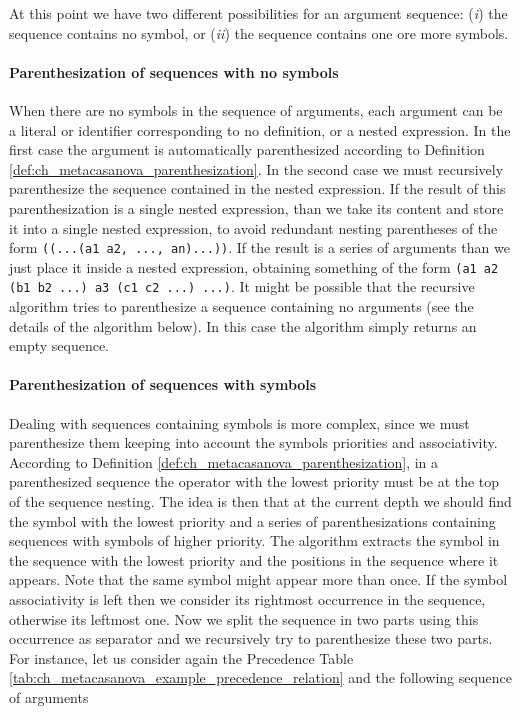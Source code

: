 At this point we have two different possibilities for an argument sequence: (\textit{i}) the sequence contains no symbol, or (\textit{ii}) the sequence contains one ore more symbols.

\paragraph{Parenthesization of sequences with no symbols}
When there are no symbols in the sequence of arguments, each argument can be a literal or identifier corresponding to no definition, or a nested expression. In the first case the argument is automatically parenthesized according to Definition \ref{def:ch_metacasanova_parenthesization}. In the second case we must recursively parenthesize the sequence contained in the nested expression. If the result of this parenthesization is a single nested expression, than we take its content and store it into a single nested expression, to avoid redundant nesting parentheses of the form \texttt{((...(a1 a2, ..., an)...))}. If the result is a series of arguments than we just place it inside a nested expression, obtaining something of the form \texttt{(a1 a2 (b1 b2 ...) a3 (c1 c2 ...) ...)}. It might be possible that the recursive algorithm tries to parenthesize a sequence containing no arguments (see the details of the algorithm below). In this case the algorithm simply returns an empty sequence.

\paragraph{Parenthesization of sequences with symbols}
Dealing with sequences containing symbols is more complex, since we must parenthesize them keeping into account the symbols priorities and associativity. According to Definition \ref{def:ch_metacasanova_parenthesization}, in a parenthesized sequence the operator with the lowest priority must be at the top of the sequence nesting. The idea is then that at the current depth we should find the symbol with the lowest priority and a series of parenthesizations containing sequences with symbols of higher priority. The algorithm extracts the symbol in the sequence with the lowest priority and the positions in the sequence where it appears. Note that the same symbol might appear more than once. If the symbol associativity is left then we consider its rightmost occurrence in the sequence, otherwise its leftmost one. Now we split the sequence in two parts using this occurrence as separator and we recursively try to parenthesize these two parts. For instance, let us consider again the Precedence Table \ref{tab:ch_metacasanova_example_precedence_relation} and the following sequence of arguments

